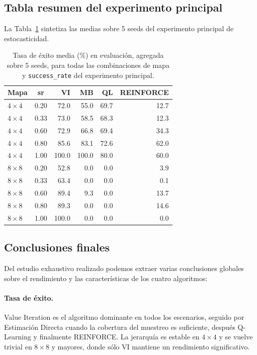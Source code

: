 \documentclass[11pt,a4paper]{article}
\begin{document}
\subsection{Tabla resumen del experimento principal}

La Tabla~\ref{tab:summary} sintetiza las medias sobre 5 seeds del experimento principal de estocasticidad.

\begin{table}[H]
  \centering
  \small
  \caption{Tasa de éxito media (\%) en evaluación, agregada sobre 5 seeds, para todas las combinaciones de mapa y \texttt{success\_rate} del experimento principal.}
  \label{tab:summary}
  \begin{tabular}{lcrrrr}
    \toprule
    \textbf{Mapa} & \textbf{sr} & \textbf{VI} & \textbf{MB} & \textbf{QL} & \textbf{REINFORCE} \\
    \midrule
    $4\times 4$  & 0.20 &  72.0 & 55.0 & 69.7 & 12.7 \\
    $4\times 4$  & 0.33 &  73.0 & 58.5 & 68.3 & 12.3 \\
    $4\times 4$  & 0.60 &  72.9 & 66.8 & 69.4 & 34.3 \\
    $4\times 4$  & 0.80 &  85.6 & 83.1 & 72.6 & 62.0 \\
    $4\times 4$  & 1.00 & 100.0 &100.0 & 80.0 & 60.0 \\
    \midrule
    $8\times 8$  & 0.20 &  52.8 &  0.0 &  0.0 &  3.9 \\
    $8\times 8$  & 0.33 &  63.4 &  0.0 &  0.0 &  0.1 \\
    $8\times 8$  & 0.60 &  89.4 &  9.3 &  0.0 & 13.7 \\
    $8\times 8$  & 0.80 &  89.3 &  0.0 &  0.0 & 14.6 \\
    $8\times 8$  & 1.00 & 100.0 &  0.0 &  0.0 &  0.0 \\
    \bottomrule
  \end{tabular}
\end{table}

\subsection{Conclusiones finales}

Del estudio exhaustivo realizado podemos extraer varias conclusiones globales sobre el rendimiento y las características de los cuatro algoritmos:

\paragraph{Tasa de éxito.} Value Iteration es el algoritmo dominante en todos los escenarios, seguido por Estimación Directa cuando la cobertura del muestreo es suficiente, después Q-Learning y finalmente REINFORCE. La jerarquía es estable en $4\times 4$ y se vuelve trivial en $8\times 8$ y mayores, donde sólo VI mantiene un rendimiento significativo.
\end{document}
